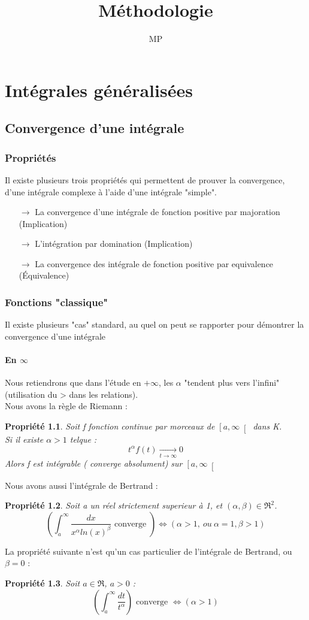 \documentclass[a4paper,12 pt,oneside]{report}     %
\title{Méthodologie}
\author{MP}
\newtheorem{prop}{Propriété}
\begin{document}
\maketitle
\tableofcontents
\chapter{Intégrales généralisées}
\section{Convergence d'une intégrale}
\subsection{Propriétés}
Il existe plusieurs trois propriétés qui permettent de prouver la convergence, d'une intégrale complexe à l'aide d'une intégrale "simple".
\begin{itemize}
 \item[$\rightarrow$] La convergence d'une intégrale de fonction positive par majoration (Implication)
 \item[$\rightarrow$] L'intégration par domination (Implication)
 \item[$\rightarrow$] La convergence des intégrale de fonction positive par equivalence (Équivalence)
\end{itemize}
\subsection{Fonctions "classique"}
Il existe plusieurs "cas" standard, au quel on peut se rapporter pour démontrer la convergence d'une intégrale
\subsubsection{En $\infty$}
Nous retiendrons que dans l'étude en $+\infty$, les $\alpha$ "tendent plus vers l'infini" (utilisation du > dans les relations). \\
Nous avons la règle de Riemann :
\begin{prop}
Soit f fonction continue par morceaux de $\left[a,\infty\right[$ dans K.\\
Si il existe $\alpha > 1$ telque : 
$$t^{\alpha}f(t) \underset{t \rightarrow \infty}\rightarrow 0$$
Alors f est intégrable ( converge absolument) sur $\left[a,\infty\right[$
\end{prop}
Nous avons aussi l'intégrale de Bertrand : 
\begin{prop}
Soit a un réel strictement superieur à 1, et $(\alpha,\beta) \in \Re^2$.
$$\left(\int_a^{\infty} \dfrac{dx}{x^{\alpha}ln(x)^{\beta}} \mbox{ converge }\right) \Leftrightarrow ( \alpha > 1,~ ou~ \alpha=1,\beta>1)$$
\end{prop}
La propriété suivante n'est qu'un cas particulier de l'intégrale de Bertrand, ou $\beta = 0$ :
\begin{prop}
Soit $a \in \Re$, $a>0$ :
$$\left(\int_a^{\infty} \dfrac{dt}{t^{\alpha}}\right) \mbox{ converge } \Leftrightarrow (\alpha > 1)$$
\end{prop}
\end{document}
